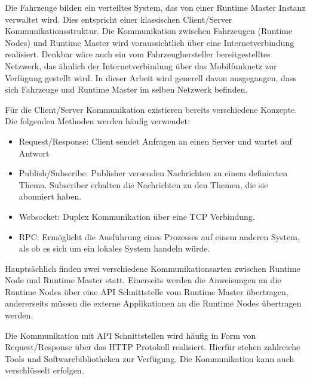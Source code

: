 Die Fahrzeuge bilden ein verteiltes System, das von einer Runtime Master Instanz verwaltet wird. Dies entspricht einer klassischen Client/Server Kommunikationsstruktur. Die Kommunikation zwischen Fahrzeugen (Runtime Nodes) und Runtime Master wird voraussichtlich über eine Internetverbindung realisiert. Denkbar wäre auch ein vom Fahrzeughersteller bereitgestelltes Netzwerk, das ähnlich der Internetverbindung über das Mobilfunknetz zur Verfügung gestellt wird. In dieser Arbeit wird generell davon ausgegangen, dass sich Fahrzeuge und Runtime Master im selben Netzwerk befinden. 

Für die Client/Server Kommunikation existieren bereits verschiedene Konzepte. Die folgenden Methoden werden häufig verwendet:

\begin{itemize}
    \item Request/Response: Client sendet Anfragen an einen Server und wartet auf Antwort
    \item Publish/Subscribe: Publisher versenden Nachrichten zu einem definierten Thema. Subscriber erhalten die Nachrichten zu den Themen, die sie abonniert haben.
    \item Websocket: Duplex Kommunikation über eine \gls{TCP} Verbindung. 
    \item \gls{RPC}: Ermöglicht die Ausführung eines Prozesses auf einem anderen System, als ob es sich um ein lokales System handeln würde.
\end{itemize}

Hauptsächlich finden zwei verschiedene Kommunikationsarten zwischen Runtime Node und Runtime Master statt. Einerseits werden die Anweisungen an die Runtime Nodes über eine \gls{API} Schnittstelle vom Runtime Master übertragen, andererseits müssen die externe Applikationen an die Runtime Nodes übertragen werden. 

Die Kommunikation mit \gls{API} Schnittstellen wird häufig in Form von Request/Response über das \gls{HTTP} Protokoll realisiert. Hierfür stehen zahlreiche Tools und Softwarebibliotheken zur Verfügung. Die Kommunikation kann auch verschlüsselt erfolgen. 

